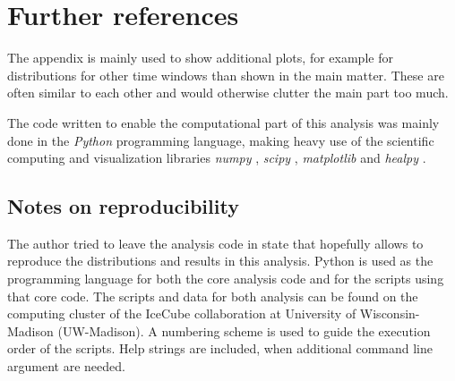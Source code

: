 \chapter{Further references}
The appendix is mainly used to show additional plots, for example for distributions for other time windows than shown in the main matter.
These are often similar to each other and would otherwise clutter the main part too much.

The code written to enable the computational part of this analysis was mainly done in the \emph{Python} programming language, making heavy use of the scientific computing and visualization libraries \emph{numpy} \cite{numpy}, \emph{scipy} \cite{scipy}, \emph{matplotlib} \cite{matplotlib} and \emph{healpy} \cite{Gorski:2004by}.

\section{Notes on reproducibility}
The author tried to leave the analysis code in state that hopefully allows to reproduce the distributions and results in this analysis.
Python is used as the programming language for both the core analysis code and for the scripts using that core code.
The scripts and data for both analysis can be found on the computing cluster of the IceCube collaboration at University of Wisconsin-Madison (UW-Madison).
A numbering scheme is used to guide the execution order of the scripts.
Help strings are included, when additional command line argument are needed.

